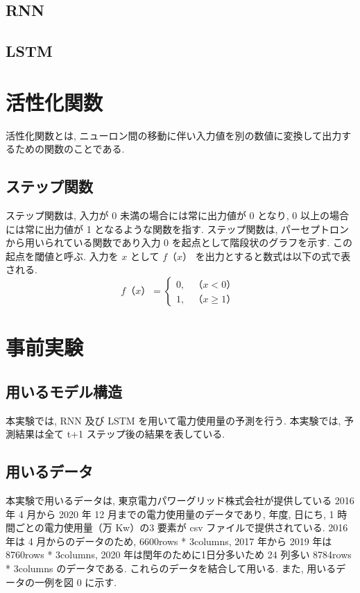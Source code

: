 \subsection{RNN}
\subsection{LSTM}

\section{活性化関数}
活性化関数とは, ニューロン間の移動に伴い入力値を別の数値に変換して出力するための関数のことである.
\subsection{ステップ関数}
ステップ関数は, 入力が 0 未満の場合には常に出力値が 0 となり, 0 以上の場合には常に出力値が 1 となるような関数を指す. ステップ関数は, パーセプトロンから用いられている関数であり入力 0 を起点として階段状のグラフを示す. この起点を閾値と呼ぶ. 入力を $x$ として $f（x）$ を出力とすると数式は以下の式で表される.
\begin{equation}
f（x）= \begin{cases}
0, & （x < 0）\\
1, & （x \geq 1）
\end{cases}
\end{equation}

\section{事前実験}
\subsection{用いるモデル構造}
本実験では, RNN 及び LSTM を用いて電力使用量の予測を行う. 本実験では, 予測結果は全て t+1 ステップ後の結果を表している. 
\subsection{用いるデータ}
本実験で用いるデータは, 東京電力パワーグリッド株式会社が提供している 2016 年 4 月から 2020 年 12 月までの電力使用量のデータであり, 年度, 日にち, 1 時間ごとの電力使用量（万 Kw）の3 要素が csv ファイルで提供されている. 2016 年は 4 月からのデータのため, 6600rows * 3columns, 2017 年から 2019 年は 8760rows * 3columns, 2020 年は閏年のために1日分多いため 24 列多い 8784rows * 3columns のデータである. これらのデータを結合して用いる. また, 用いるデータの一例を図 0 に示す.

